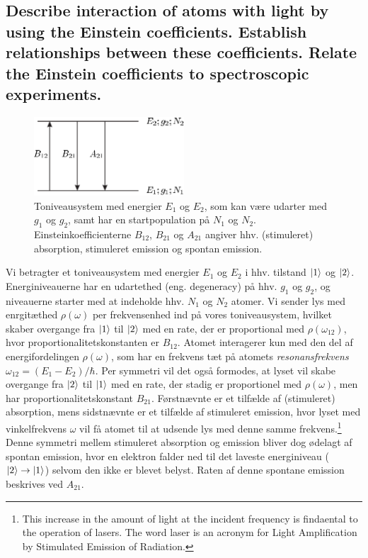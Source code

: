 \subsection{Describe interaction of atoms with light by using the Einstein coefficients. Establish relationships between these coefficients. Relate the Einstein coefficients to spectroscopic experiments.}


\begin{figure}[!h]
    \centering
    \includegraphics[width=0.5\textwidth]{Q02/images/TwoLevelSystem2.PNG}
    \caption{Toniveausystem med energier $E_1$ og $E_2$, som kan være udarter med $g_1$ og $g_2$, samt har en startpopulation på $N_1$ og $N_2$. Einsteinkoefficienterne $B_{12}$, $B_{21}$ og $A_{21}$ angiver hhv. (stimuleret) absorption, stimuleret emission og spontan emission.}
    \label{fig:Q02_TwoLevelSystem}
\end{figure}

Vi betragter et toniveausystem med energier $E_1$ og $E_2$ i hhv. tilstand $\ket{1}$ og $\ket{2}$. Energiniveauerne har en udartethed (eng. degeneracy) på hhv. $g_1$ og $g_2$, og niveauerne starter med at indeholde hhv. $N_1$ og $N_2$ atomer. Vi sender lys med enrgitæthed $\rho(\omega)$ per frekvensenhed ind på vores toniveausystem, hvilket skaber overgange fra $\ket{1}$ til $\ket{2}$ med en rate, der er proportional med $\rho(\omega_{12})$, hvor proportionalitetskonstanten er $B_{12}$. Atomet interagerer kun med den del af energifordelingen $\rho(\omega)$, som har en frekvens tæt på atomets \emph{resonansfrekvens} $\omega_{12} = (E_1 - E_2)/\hbar$. Per symmetri vil det også formodes, at lyset vil skabe overgange fra $\ket{2}$ til $\ket{1}$ med en rate, der stadig er proportionel med $\rho(\omega)$, men har proportionalitetskonstant $B_{21}$. Førstnævnte er et tilfælde af (stimuleret) absorption, mens sidstnævnte er et tilfælde af stimuleret emission, hvor lyset med vinkelfrekvens $\omega$ vil få atomet til at udsende lys med denne samme frekvens.\footnote{This increase in the amount of light at the incident frequency is findaental to the operation of lasers. The word \textsf{laser} is an acronym for Light Amplification by Stimulated Emission of Radiation.} Denne symmetri mellem stimuleret absorption og emission bliver dog ødelagt af spontan emission, hvor en elektron falder ned til det laveste energiniveau ($\ket{2} \rightarrow \ket{1}$) selvom den ikke er blevet belyst. Raten af denne spontane emission beskrives ved $A_{21}$.


